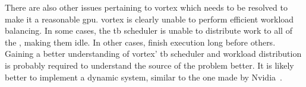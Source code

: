 There are also other issues pertaining to \Gls{vortex} which needs to be resolved to make it a reasonable \acrshort{gpu}. \Gls{vortex} is clearly unable to perform efficient workload balancing. In some cases, the \acrshort{tb} scheduler is unable to distribute work to all of the , making them idle. In other cases,  finish execution long before others. Gaining a better understanding of \Gls{vortex}' \acrshort{tb} scheduler and workload distribution is probably required to understand the source of the problem better. It is likely better to implement a dynamic system, similar to the one made by Nvidia~\cite{CTA_scheduling}.  